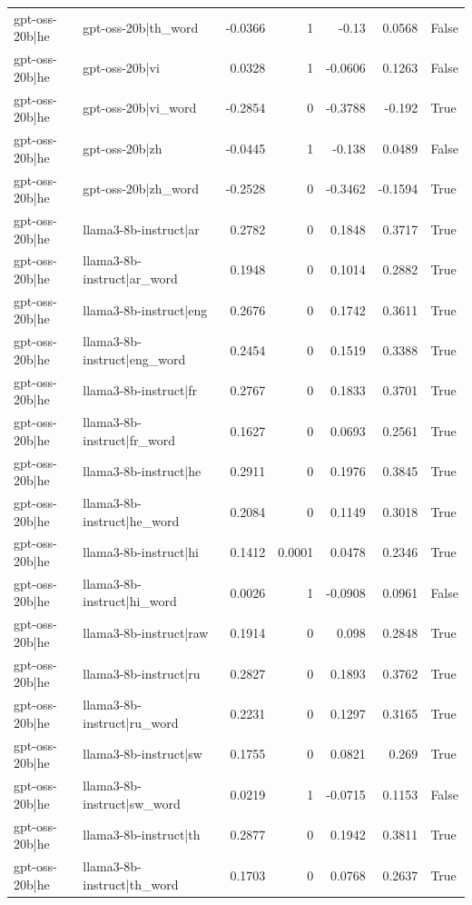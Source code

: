 \begin{table}
\begin{tabular}{l l r r r r l}
gpt-oss-20b|he & gpt-oss-20b|th_word & -0.0366 & 1 & -0.13 & 0.0568 & False \\
gpt-oss-20b|he & gpt-oss-20b|vi & 0.0328 & 1 & -0.0606 & 0.1263 & False \\
gpt-oss-20b|he & gpt-oss-20b|vi_word & -0.2854 & 0 & -0.3788 & -0.192 & True \\
gpt-oss-20b|he & gpt-oss-20b|zh & -0.0445 & 1 & -0.138 & 0.0489 & False \\
gpt-oss-20b|he & gpt-oss-20b|zh_word & -0.2528 & 0 & -0.3462 & -0.1594 & True \\
gpt-oss-20b|he & llama3-8b-instruct|ar & 0.2782 & 0 & 0.1848 & 0.3717 & True \\
gpt-oss-20b|he & llama3-8b-instruct|ar_word & 0.1948 & 0 & 0.1014 & 0.2882 & True \\
gpt-oss-20b|he & llama3-8b-instruct|eng & 0.2676 & 0 & 0.1742 & 0.3611 & True \\
gpt-oss-20b|he & llama3-8b-instruct|eng_word & 0.2454 & 0 & 0.1519 & 0.3388 & True \\
gpt-oss-20b|he & llama3-8b-instruct|fr & 0.2767 & 0 & 0.1833 & 0.3701 & True \\
gpt-oss-20b|he & llama3-8b-instruct|fr_word & 0.1627 & 0 & 0.0693 & 0.2561 & True \\
gpt-oss-20b|he & llama3-8b-instruct|he & 0.2911 & 0 & 0.1976 & 0.3845 & True \\
gpt-oss-20b|he & llama3-8b-instruct|he_word & 0.2084 & 0 & 0.1149 & 0.3018 & True \\
gpt-oss-20b|he & llama3-8b-instruct|hi & 0.1412 & 0.0001 & 0.0478 & 0.2346 & True \\
gpt-oss-20b|he & llama3-8b-instruct|hi_word & 0.0026 & 1 & -0.0908 & 0.0961 & False \\
gpt-oss-20b|he & llama3-8b-instruct|raw & 0.1914 & 0 & 0.098 & 0.2848 & True \\
gpt-oss-20b|he & llama3-8b-instruct|ru & 0.2827 & 0 & 0.1893 & 0.3762 & True \\
gpt-oss-20b|he & llama3-8b-instruct|ru_word & 0.2231 & 0 & 0.1297 & 0.3165 & True \\
gpt-oss-20b|he & llama3-8b-instruct|sw & 0.1755 & 0 & 0.0821 & 0.269 & True \\
gpt-oss-20b|he & llama3-8b-instruct|sw_word & 0.0219 & 1 & -0.0715 & 0.1153 & False \\
gpt-oss-20b|he & llama3-8b-instruct|th & 0.2877 & 0 & 0.1942 & 0.3811 & True \\
gpt-oss-20b|he & llama3-8b-instruct|th_word & 0.1703 & 0 & 0.0768 & 0.2637 & True \\

\end{tabular}
\end{table}
